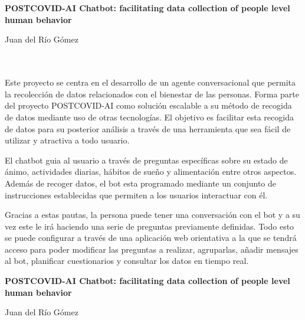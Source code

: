\chapter*{}
\thispagestyle{empty}


\begin{center}
{\large\bfseries POSTCOVID-AI Chatbot: facilitating data collection of people level human behavior }\\
\end{center}
\begin{center}
Juan del Río Gómez\\
\end{center}
\vspace{0.7cm}
\\

\vspace{0.7cm}
\\

Este proyecto se centra en el desarrollo de un agente conversacional que permita la recolección de datos relacionados con el bienestar de las personas. Forma parte del proyecto POSTCOVID-AI como solución escalable a su método de recogida de datos mediante uso de otras tecnologías. El objetivo es facilitar esta recogida de datos para su posterior análisis a través de una herramienta que sea fácil de utilizar y atractiva a todo usuario.\vspace{0.3cm}

El chatbot guia al usuario a través de preguntas específicas sobre su estado de ánimo, actividades diarias, hábitos de sueño y alimentación entre otros aspectos. Además de recoger datos, el bot esta programado mediante un conjunto de instrucciones establecidas que permiten a los usuarios interactuar con él.\vspace{0.3cm}

Gracias a estas pautas, la persona puede tener una conversación con el bot y a su vez este le irá haciendo una serie de preguntas previamente definidas. Todo esto se puede configurar a través de una aplicación web orientativa a la que se tendrá acceso para poder modificar las preguntas a realizar, agruparlas, añadir mensajes al bot, planificar cuestionarios y consultar los datos en tiempo real.


\cleardoublepage
\thispagestyle{empty}

\begin{center}
{\large\bfseries POSTCOVID-AI Chatbot: facilitating data collection of people level human behavior }\\
\end{center}
\begin{center}
Juan del Río Gómez\\
\end{center}
\vspace{0.7cm}
\\

